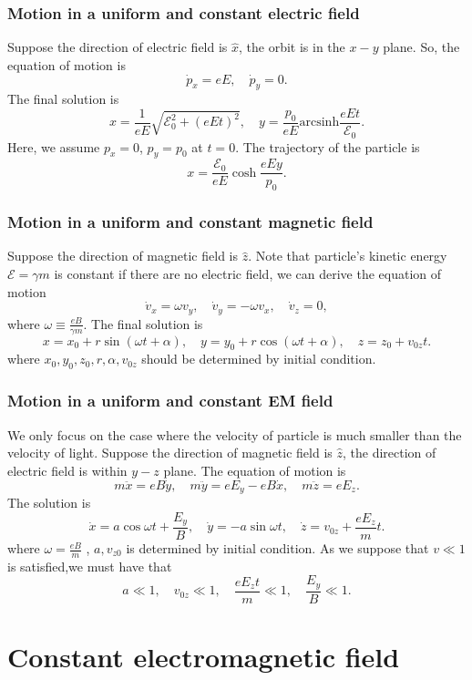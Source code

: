 \subsubsection{Motion in a uniform and constant electric field}
Suppose the direction of electric field is  $\hat{x}$, the orbit is in the $x-y$ plane. So, the equation of motion is
\[\dot{p}_x = eE , \quad \dot{p}_y = 0.\]
The final solution is
\[x = \frac{1}{eE}\sqrt{\mathcal{E}_0^2 + (eEt)^2} , \quad y = \frac{p_0}{eE} \mathrm{arcsinh} \frac{eEt}{\mathcal{E}_0}.\]
Here, we assume $p_x = 0$, $p_y=p_0$ at $t = 0$.
The trajectory of the particle is
\[x = \frac{\mathcal{E}_0}{eE}\cosh \frac{eEy}{p_0}.\]

\subsubsection{Motion in a uniform and constant magnetic field}
Suppose the direction of magnetic field is $\hat{z}$. Note that particle's kinetic energy $\mathcal{E} = \gamma m$ is constant if there are no electric field, we can derive the equation of motion
\[\dot{v}_x = \omega v_y , \quad \dot{v}_y = -\omega v_x , \quad \dot{v}_z = 0,\]
where $\omega \equiv \frac{eB}{\gamma m}$. The final solution is
\[x = x_0 + r\sin(\omega t + \alpha) , \quad y = y_0 + r\cos(\omega t + \alpha) , \quad z = z_0 + v_{0z}t.\]
where $x_0,y_0,z_0,r,\alpha,v_{0z}$ should be determined by initial condition.

\subsubsection{Motion in a uniform and constant EM field}
We only focus on the case where the velocity of particle is much smaller than the velocity of light. 
Suppose the direction of magnetic field is $\hat{z}$, the direction of electric field is within $y-z$ plane. The equation of motion is
\[m\ddot{x} = eB\dot{y} , \quad m\ddot{y} =eE_y - eB\dot{x} , \quad m\ddot{z}=eE_z.\]
The solution is
\[\dot{x} = a \cos \omega t + \frac{E_y}{B} , \quad \dot{y} = -a\sin \omega t , \quad \dot{z} = v_{0z} + \frac{eE_z}{m}t.\]
where $\omega = \frac{eB}{m}$ , $a,v_{z0}$ is determined by initial condition. As we suppose that $v \ll 1$ is satisfied,we must have that
\[a \ll 1 , \quad v_{0z} \ll 1 , \quad \frac{eE_z t}{m} \ll 1 , \quad \frac{E_y}{B} \ll 1.\]

\section{Constant electromagnetic field}
